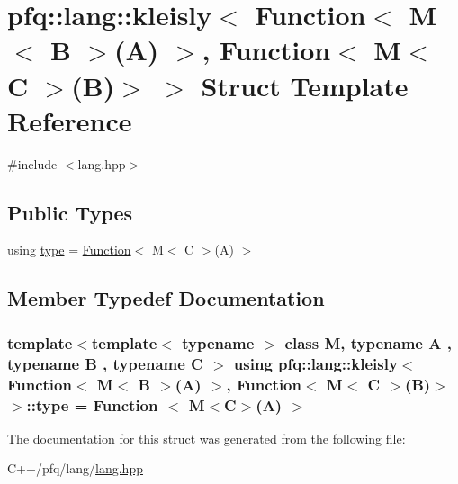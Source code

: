 \hypertarget{structpfq_1_1lang_1_1kleisly_3_01Function_3_01M_3_01B_01_4_07A_08_01_4_00_01Function_3_01M_3_01C_01_4_07B_08_4_01_4}{\section{pfq\+:\+:lang\+:\+:kleisly$<$ Function$<$ M$<$ B $>$(A) $>$, Function$<$ M$<$ C $>$(B)$>$ $>$ Struct Template Reference}
\label{structpfq_1_1lang_1_1kleisly_3_01Function_3_01M_3_01B_01_4_07A_08_01_4_00_01Function_3_01M_3_01C_01_4_07B_08_4_01_4}
}


{\ttfamily \#include $<$lang.\+hpp$>$}

\subsection*{Public Types}
\begin{DoxyCompactItemize}
\item 
using \hyperlink{structpfq_1_1lang_1_1kleisly_3_01Function_3_01M_3_01B_01_4_07A_08_01_4_00_01Function_3_01M_3_01C_01_4_07B_08_4_01_4_add8114ae2219624ca829d1409d6695bc}{type} = \hyperlink{structpfq_1_1lang_1_1Function}{Function}$<$ M$<$ C $>$(A) $>$
\end{DoxyCompactItemize}


\subsection{Member Typedef Documentation}
\hypertarget{structpfq_1_1lang_1_1kleisly_3_01Function_3_01M_3_01B_01_4_07A_08_01_4_00_01Function_3_01M_3_01C_01_4_07B_08_4_01_4_add8114ae2219624ca829d1409d6695bc}{
\subsubsection[{type}]{\setlength{\rightskip}{0pt plus 5cm}template$<$template$<$ typename $>$ class M, typename A , typename B , typename C $>$ using {\bf pfq\+::lang\+::kleisly}$<$ {\bf Function}$<$ M$<$ B $>$(A) $>$, {\bf Function}$<$ M$<$ C $>$(B)$>$ $>$\+::{\bf type} =  {\bf Function} $<$ M$<$C$>$(A) $>$}}\label{structpfq_1_1lang_1_1kleisly_3_01Function_3_01M_3_01B_01_4_07A_08_01_4_00_01Function_3_01M_3_01C_01_4_07B_08_4_01_4_add8114ae2219624ca829d1409d6695bc}


The documentation for this struct was generated from the following file\+:\begin{DoxyCompactItemize}
\item 
C++/pfq/lang/\hyperlink{lang_8hpp}{lang.\+hpp}\end{DoxyCompactItemize}
